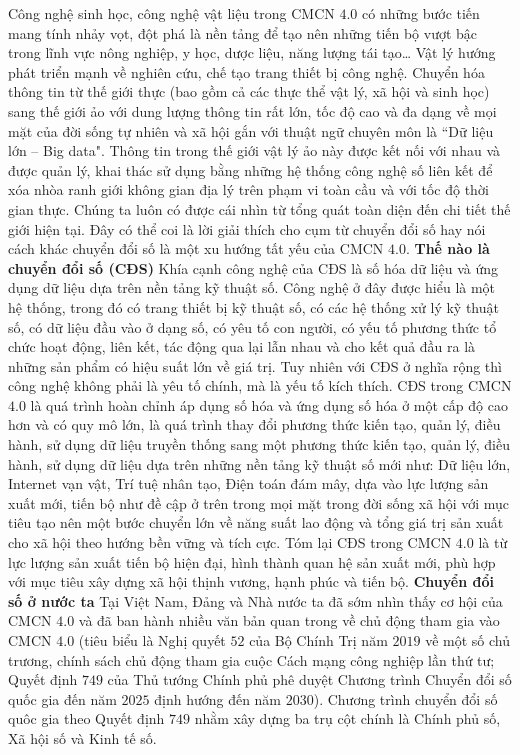 \begin{multicols}{2}
	\vskip 0.05cm
	Công nghệ sinh học, công nghệ vật liệu trong CMCN $4.0$ có những bước tiến mang tính nhảy vọt, đột phá là nền tảng để tạo nên những tiến bộ vượt bậc trong lĩnh vực nông nghiệp, y học, dược liệu, năng lượng tái tạo… Vật lý hướng phát triển mạnh về nghiên cứu, chế tạo trang thiết bị công nghệ.
	\vskip 0.05cm
	Chuyển hóa thông tin từ thế giới thực (bao gồm cả các thực thể vật lý, xã hội và sinh học) sang thế giới ảo với dung lượng thông tin rất lớn, tốc độ cao và đa dạng về mọi mặt của đời sống tự nhiên và xã hội gắn với thuật ngữ chuyên môn là ``Dữ liệu lớn -- Big data". 
	\vskip 0.05cm
	Thông tin trong thế giới vật lý ảo này được kết nối với nhau và được quản lý, khai thác sử dụng bằng những hệ thống công nghệ số liên kết để xóa nhòa ranh giới không gian địa lý trên phạm vi toàn cầu và với tốc độ thời gian thực. Chúng ta luôn có được cái nhìn từ tổng quát toàn diện đến chi tiết thế giới hiện tại. Đây có thể coi là lời giải thích cho cụm từ chuyển đổi số hay nói cách khác chuyển đổi số là một xu hướng tất yếu của CMCN $4{.}0$.
	\vskip 0.05cm
	\textbf{\color{toanhocdoisong}Thế nào là chuyển đổi số (CĐS)}
	\vskip 0.05cm
	Khía cạnh công nghệ của CĐS là số hóa dữ liệu và ứng dụng dữ liệu dựa trên nền tảng kỹ thuật số. Công nghệ ở đây được hiểu là một hệ thống, trong đó có trang thiết bị kỹ thuật số, có các hệ thống xử lý kỹ thuật số, có dữ liệu đầu vào ở dạng số, có yêu tố con người, có yếu tố phương thức tổ chức hoạt động,  liên kết, tác động qua lại lẫn nhau và cho kết quả đầu ra là những sản phẩm có hiệu suất lớn về giá trị.
	\vskip 0.05cm
	Tuy nhiên với CĐS ở nghĩa rộng thì công nghệ không phải là yêu tố chính, mà là yếu tố kích thích. CĐS trong CMCN $4{.}0$ là quá trình hoàn chỉnh áp dụng số hóa và ứng dụng số hóa ở một cấp độ cao hơn và có quy mô lớn, là quá trình thay đổi phương thức kiến tạo, quản lý, điều hành, sử dụng dữ liệu truyền thống sang một phương thức kiến tạo, quản lý, điều hành, sử dụng dữ liệu dựa trên những nền tảng kỹ thuật số mới như: Dữ liệu lớn, Internet vạn vật, Trí tuệ nhân tạo, Điện toán đám mây, dựa vào lực lượng sản xuất mới, tiến bộ như đề cập ở trên trong mọi mặt trong đời sống xã hội với mục tiêu tạo nên một bước chuyển lớn về năng suất lao động và tổng giá trị sản xuất cho xã hội theo hướng bền vững và tích cực. Tóm lại CĐS trong CMCN $4{.}0$ là từ lực lượng sản xuất tiến bộ hiện đại, hình thành quan hệ sản xuất mới, phù hợp với mục tiêu xây dựng xã hội thịnh vương, hạnh phúc và tiến bộ. 
	\vskip 0.05cm
	\textbf{\color{toanhocdoisong}Chuyển đổi số ở nước ta}
	\vskip 0.05cm
	Tại Việt Nam, Đảng và Nhà nước ta đã sớm nhìn thấy cơ hội của CMCN $4{.}0$ và đã ban hành nhiều văn bản quan trong về chủ động tham gia vào CMCN $4{.}0$ (tiêu biểu là Nghị quyết $52$ của Bộ Chính Trị năm $2019$ về một số chủ trương, chính sách chủ động tham gia cuộc Cách mạng công  nghiệp lần thứ tư; Quyết định $749$ của Thủ tướng Chính phủ phê duyệt Chương trình Chuyển đổi số quốc gia đến năm $2025$ định hướng đến năm $2030$). Chương trình chuyển đổi số quôc gia theo Quyết định $749$ nhằm xây dựng ba trụ cột chính là Chính phủ số, Xã hội số và Kinh tế số.

\end{multicols}
